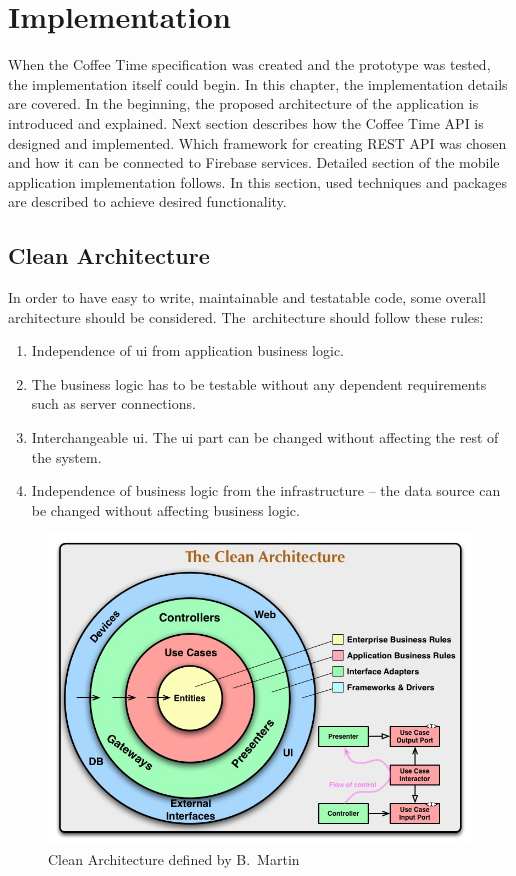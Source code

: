 \chapter{Implementation}
\label{ch:implementation}
When the Coffee Time specification was created and the prototype was tested, the implementation itself could begin. In this chapter, the implementation details are covered. In the beginning, the proposed architecture of the application is introduced and explained. Next section describes how the Coffee Time API is designed and implemented. Which framework for creating REST API was chosen and how it can be connected to Firebase services. Detailed section of the mobile application implementation follows. In this section, used techniques and packages are described to achieve desired functionality. 
\section{Clean Architecture}
In order to have easy to write, maintainable and testatable code, some overall architecture should be considered. The~architecture should follow these rules: 
\begin{enumerate}
\item Independence of \gls{ui} from application business logic. 
\item The business logic has to be testable without any dependent requirements such as server connections.
\item Interchangeable \gls{ui}. The \gls{ui} part can be changed without affecting the rest of the system.
\item Independence of business logic from the infrastructure -- the data source can be changed without affecting business logic.
\end{enumerate}

\begin{figure}[ht]
    \centering
    \includegraphics[width=0.75\linewidth]{img/implementation/CleanArchitecture.jpg}
    \caption{Clean Architecture defined by B.~Martin~\cite{clean-architecture-article}}
    \label{fig:clean-arch-bmartin}
\end{figure}

